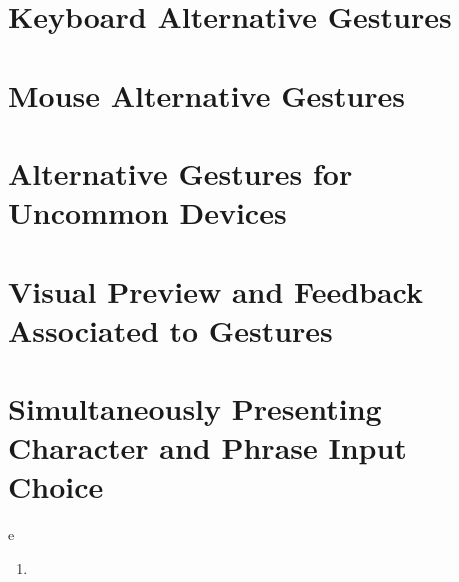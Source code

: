 \section{Keyboard Alternative
Gestures}\label{keyboard-alternative-gestures}

\section{Mouse Alternative
Gestures}\label{mouse-alternative-gestures}

\section{Alternative Gestures for Uncommon
Devices}\label{alternative-gestures-for-uncommon-devices}

\section{Visual Preview and Feedback Associated to
Gestures}\label{visual-preview-and-feedback-associated-to-gestures}

\section{Simultaneously Presenting Character and Phrase Input
Choice}\label{simultaneously-presenting-character-and-phrase-input-choice}

e

\begin{enumerate}
\def\labelenumi{\arabic{enumi}.}
\setcounter{enumi}{4}
\tightlist
\item
\end{enumerate}
